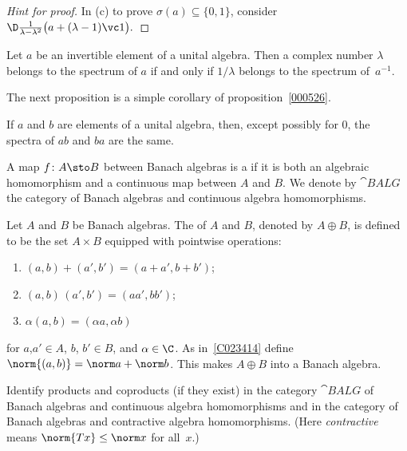 \begin{proof}[\emph{Hint for proof}] In (c) to prove $\sigma(a) \subseteq \{0,1\}$,
consider $\D \frac1{\lambda - \lambda^2}\bigl(a + (\lambda - 1)\vc 1\bigr).$ \ns
\end{proof}

\begin{prop} Let $a$ be an invertible element of a unital algebra. Then a complex number
$\lambda$ belongs to the spectrum of $a$ if and only if $1/\lambda$ belongs to the
spectrum of~$a^{-1}$.
\end{prop}

The next proposition is a simple corollary of proposition~\ref{000526}.

\begin{prop}\label{000575} If $a$ and $b$ are elements of a unital algebra, then,
except possibly for $0$, the spectra of $ab$ and $ba$ are the same.
\end{prop}

\begin{defn}\label{C035854} A map $f \colon A \sto B$ between Banach algebras is a
 if it is both an algebraic homomorphism and a
continuous map between $A$ and $B$.  We denote
by $\cat{BALG}$ the category of Banach algebras and continuous algebra homomorphisms.
\end{defn}

\begin{prop} Let $A$ and $B$ be Banach algebras.  The
 of $A$ and $B$, denoted by $A \oplus B$, is defined to be the set $A
\times B$ equipped with pointwise operations:
   \begin{enumerate}[label=\rm{(\alph*)}]
     \item $(a,b) + (a',b') = (a + a',b + b')$;
     \item $(a,b)\,(a',b') = (aa',bb')$;
     \item $\alpha(a,b) = (\alpha a,\alpha b)$
   \end{enumerate}
for $a$,$a' \in A$, $b$, $b' \in B$, and $\alpha \in \C$. As in~\ref{C023414} define
$\norm{(a,b)} = \norm a + \norm b$.  This makes $A \oplus B$ into a Banach algebra.
\end{prop}

\begin{exer} Identify products and coproducts (if they exist) in the category $\cat{BALG}$
of Banach algebras
and continuous algebra homomorphisms and in the category of Banach algebras and
contractive algebra homomorphisms. (Here
\emph{contractive} means $\norm{Tx} \le \norm x$ for all~$x$.)
\end{exer}

